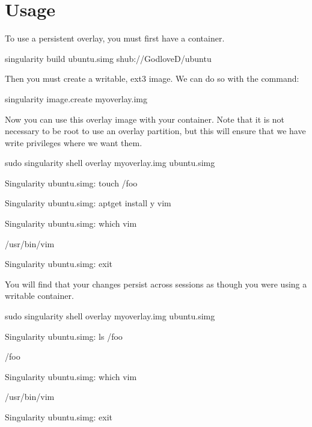 \documentclass[letterpaper,10pt,english]{sphinxmanual}
\begin{document}
\section{Usage}
\label{\detokenize{persistent_overlays:usage}}
To use a persistent overlay, you must first have a container.

%
\begin{sphinxVerbatim}[commandchars=\\\{\}]
\PYGZdl{} singularity build ubuntu.simg shub://GodloveD/ubuntu
\end{sphinxVerbatim}

Then you must create a writable, ext3 image. We can do so with the 
command:

%
\begin{sphinxVerbatim}[commandchars=\\\{\}]
\PYGZdl{} singularity image.create my\PYGZhy{}overlay.img
\end{sphinxVerbatim}

Now you can use this overlay image with your container. Note that it is
not necessary to be root to use an overlay partition, but this will
ensure that we have write privileges where we want them.

%
\begin{sphinxVerbatim}[commandchars=\\\{\}]
\PYGZdl{} sudo singularity shell \PYGZhy{}\PYGZhy{}overlay my\PYGZhy{}overlay.img ubuntu.simg

Singularity ubuntu.simg:\PYGZti{}\PYGZgt{} touch /foo

Singularity ubuntu.simg:\PYGZti{}\PYGZgt{} apt\PYGZhy{}get install \PYGZhy{}y vim

Singularity ubuntu.simg:\PYGZti{}\PYGZgt{} which vim

/usr/bin/vim

Singularity ubuntu.simg:\PYGZti{}\PYGZgt{} exit
\end{sphinxVerbatim}

You will find that your changes persist across sessions as though you
were using a writable container.

%
\begin{sphinxVerbatim}[commandchars=\\\{\}]
\PYGZdl{} sudo singularity shell \PYGZhy{}\PYGZhy{}overlay my\PYGZhy{}overlay.img ubuntu.simg

Singularity ubuntu.simg:\PYGZti{}\PYGZgt{} ls /foo

/foo

Singularity ubuntu.simg:\PYGZti{}\PYGZgt{} which vim

/usr/bin/vim

Singularity ubuntu.simg:\PYGZti{}\PYGZgt{} exit
\end{sphinxVerbatim}
\end{document}
